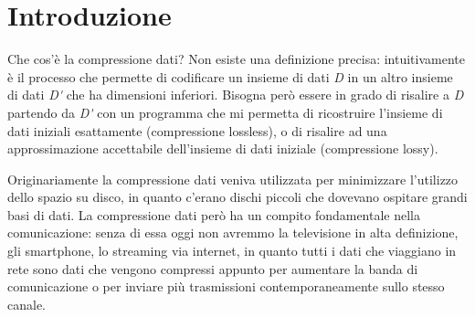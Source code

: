 \chapter{Introduzione}
Che cos'è la compressione dati? Non esiste una definizione precisa: intuitivamente è il processo che permette di codificare un insieme di dati \textit{D} in un altro insieme di dati \textit{D\'} che ha dimensioni inferiori. Bisogna però essere in grado di risalire a \textit{D} partendo da \textit{D\'} con un programma che mi permetta di ricostruire l'insieme di dati iniziali esattamente (compressione lossless), o di risalire ad una approssimazione accettabile dell'insieme di dati iniziale (compressione lossy). 

Originariamente la compressione dati veniva utilizzata per minimizzare l'utilizzo dello spazio su disco, in quanto c'erano dischi piccoli che dovevano ospitare grandi basi di dati. La compressione dati però ha un compito fondamentale nella comunicazione: senza di essa oggi non avremmo la televisione in alta definizione, gli smartphone, lo streaming via internet, in quanto tutti i dati che viaggiano in rete sono dati che vengono compressi appunto per aumentare la banda di comunicazione o per inviare più trasmissioni contemporaneamente sullo stesso canale.

